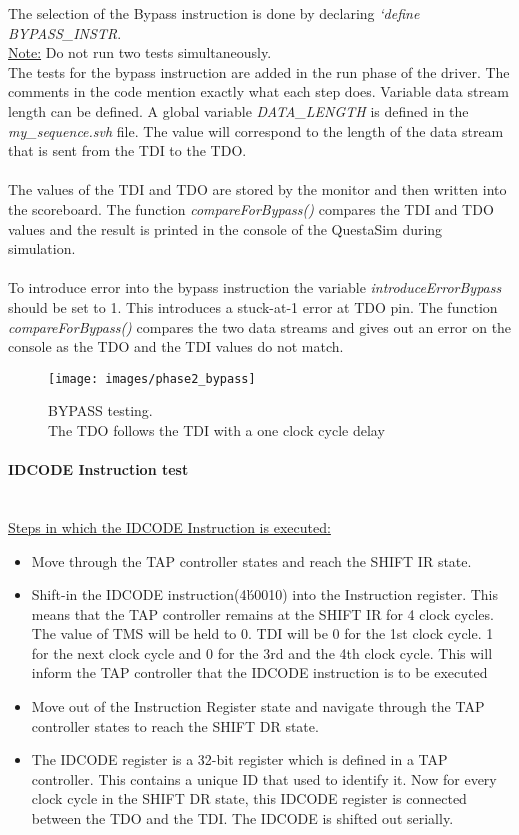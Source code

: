\documentclass[a4paper,11pt]{article}
\begin{document}
The selection of the Bypass instruction is done by declaring \textit{`define BYPASS\_INSTR}.\\ \underline{Note:} Do not run two tests simultaneously. \\
The tests for the bypass instruction are added in the run phase of the driver. The comments in the code mention exactly what each step does. Variable data stream length can be defined. A global variable \textit{DATA\_LENGTH} is defined in the \textit{my\_sequence.svh} file. The value will correspond to the length of the data stream that is sent from the TDI to the TDO. \\
 \\
The values of the TDI and TDO are stored by the monitor and then written into the scoreboard. The function \textit{compareForBypass()} compares the TDI and TDO values and the result is printed in the console of the QuestaSim during simulation. \\
 \\
 To introduce error into the bypass instruction the variable \textit{introduceErrorBypass} should be set to 1. This introduces a stuck-at-1 error at TDO pin. The function \textit{compareForBypass()} compares the two data streams and gives out an error on the console as the TDO and the TDI values do not match.\\

\begin{sidewaysfigure}[ht]
\centering
\texttt{[image: images/phase2\_bypass]}
\caption{BYPASS testing.\\ The TDO follows the TDI with a one clock cycle delay}
\label{fig:Bypass LandscapeFigure}
\end{sidewaysfigure}

\FloatBarrier
\paragraph{IDCODE Instruction test}\mbox{}\\
\underline{Steps in which the IDCODE Instruction is executed:}
\begin{itemize}[noitemsep]
\item Move through the TAP controller states and reach the SHIFT IR state.
\item Shift-in the IDCODE instruction(4\'b0010) into the Instruction register. This means that the TAP controller remains at the SHIFT IR for 4 clock cycles. The value of TMS will be held to 0. TDI will be 0 for the 1st clock cycle. 1 for the next clock cycle and 0 for the 3rd and the 4th clock cycle. This will inform the TAP controller that the IDCODE instruction is to be executed
\item Move out of the Instruction Register state and navigate through the TAP controller states to reach the SHIFT DR state.
\item The IDCODE register is a 32-bit register which is defined in a TAP controller. This contains a unique ID that used to identify it. Now for every clock cycle in the SHIFT DR state, this IDCODE register is connected between the TDO and the TDI. The IDCODE is shifted out serially.
\end{itemize}
\end{document}
